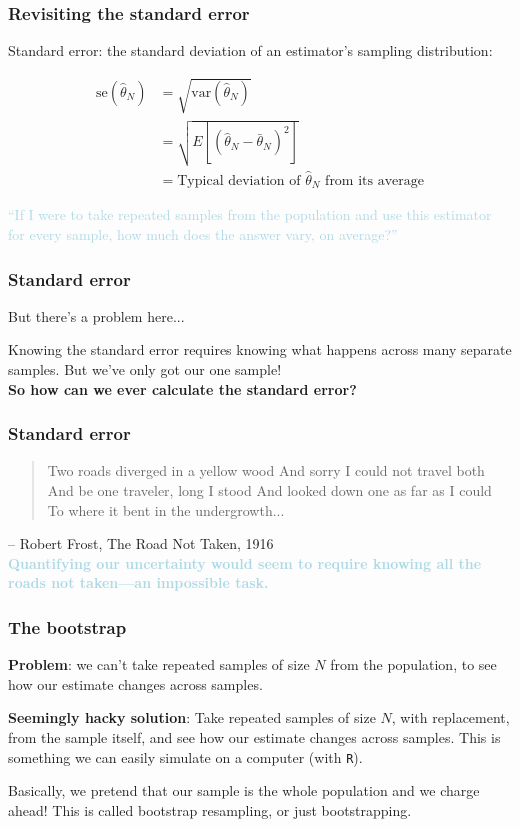 \documentclass{beamer}
\newcommand{\bo}[1]{\textcolor{burntorange}{#1}}
\newcommand{\lb}[1]{\textcolor{lightblue}{#1}}
\newcommand{\sk}{\vspace{.5cm}}
\begin{document}
\begin{frame}
	\frametitle{Revisiting the standard error}
	
	\bo{Standard error}: the standard deviation of an estimator's sampling distribution:

$$ \begin{aligned} \mbox{se}(\hat{\theta}_N) &= \sqrt{ \mbox{var}(\hat{\theta}_N) } \\ &= \sqrt{ E[ (\hat{\theta}_N - \bar{\theta}_N )^2] } \\ &= \mbox{Typical deviation of $\hat{\theta}_N$ from its average} \end{aligned} $$ \sk

\lb{``If I were to take repeated samples from the population and use this estimator for every sample, how much does the answer vary, on average?''}
\end{frame}


\begin{frame}
	\frametitle{Standard error}
	
	But there's a problem here... \\ \sk\sk

Knowing the standard error requires knowing what happens across many separate samples.
But we've only got our one sample! \\ \sk\sk
{\bf So how can we ever calculate the standard error?}

\end{frame}

\begin{frame}
\frametitle{Standard error}

\begin{quote}
	Two roads diverged in a yellow wood
And sorry I could not travel both
And be one traveler, long I stood
And looked down one as far as I could
To where it bent in the undergrowth...
\end{quote}

-- Robert Frost, The Road Not Taken, 1916 \\ \sk
{\bf \lb{Quantifying our uncertainty would seem to require knowing all the roads not taken---an impossible task.}}
\end{frame}

\begin{frame}
	\frametitle{The bootstrap}
	
{\bf Problem}: we can't take repeated samples of size $N$ from the population, to see how our estimate changes across samples. \\ \sk\sk

{\bf \bo{Seemingly hacky solution}}: Take repeated samples of size $N$, with replacement, from the sample itself, and see how our estimate changes across samples. This is something we can easily simulate on a computer (with {\tt R}).\\ \sk\sk

Basically, we pretend that our sample is the whole population and we charge ahead! This is called bootstrap resampling, or just bootstrapping.
\end{frame}
\end{document}
